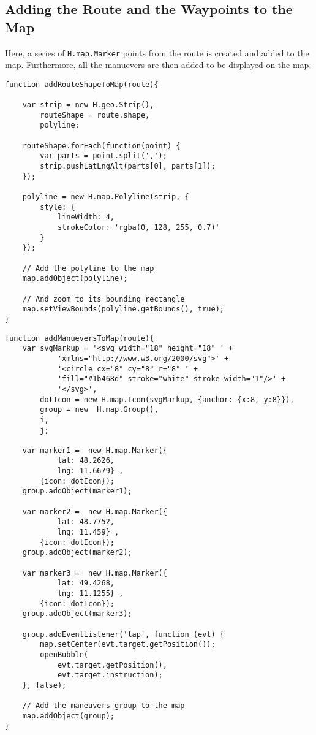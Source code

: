 \subsection{Adding the Route and the Waypoints to the Map}

Here, a series of \texttt{H.map.Marker} points from the route is created and added to the map. Furthermore, all the manuevers are then added to be displayed on the map.

\begin{verbatim}
function addRouteShapeToMap(route){

    var strip = new H.geo.Strip(),
        routeShape = route.shape,
        polyline;

    routeShape.forEach(function(point) {
        var parts = point.split(',');
        strip.pushLatLngAlt(parts[0], parts[1]);
    });

    polyline = new H.map.Polyline(strip, {
        style: {
            lineWidth: 4,
            strokeColor: 'rgba(0, 128, 255, 0.7)'
        }
    });

    // Add the polyline to the map
    map.addObject(polyline);

    // And zoom to its bounding rectangle
    map.setViewBounds(polyline.getBounds(), true);
}
\end{verbatim}


\begin{verbatim}
function addManueversToMap(route){
    var svgMarkup = '<svg width="18" height="18" ' +
            'xmlns="http://www.w3.org/2000/svg">' +
            '<circle cx="8" cy="8" r="8" ' +
            'fill="#1b468d" stroke="white" stroke-width="1"/>' +
            '</svg>',
        dotIcon = new H.map.Icon(svgMarkup, {anchor: {x:8, y:8}}),
        group = new  H.map.Group(),
        i,
        j;

    var marker1 =  new H.map.Marker({
            lat: 48.2626,
            lng: 11.6679} ,
        {icon: dotIcon});
    group.addObject(marker1);

    var marker2 =  new H.map.Marker({
            lat: 48.7752,
            lng: 11.459} ,
        {icon: dotIcon});
    group.addObject(marker2);

    var marker3 =  new H.map.Marker({
            lat: 49.4268,
            lng: 11.1255} ,
        {icon: dotIcon});
    group.addObject(marker3);

    group.addEventListener('tap', function (evt) {
        map.setCenter(evt.target.getPosition());
        openBubble(
            evt.target.getPosition(),
            evt.target.instruction);
    }, false);

    // Add the maneuvers group to the map
    map.addObject(group);
}
\end{verbatim}
